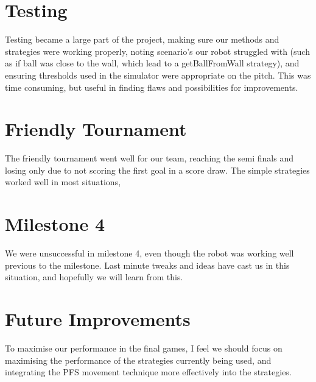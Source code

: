 \documentclass[conference,12pt]{IEEEtran}
\begin{document}

\section{Testing}
Testing became a large part of the project, making sure our methods and strategies were working properly, noting scenario's our robot struggled with (such as if ball was close to the wall, which lead to a getBallFromWall strategy), and ensuring thresholds used in the simulator were appropriate on the pitch. This was time consuming, but useful in finding flaws and possibilities for improvements.

\section{Friendly Tournament}
The friendly tournament went well for our team, reaching the semi finals and losing only due to not scoring the first goal in a score draw. The simple strategies worked well in most situations, 

\section{Milestone 4}
We were unsuccessful in milestone 4, even though the robot was working well previous to the milestone. Last minute tweaks and ideas have cast us in this situation, and hopefully we will learn from this. 

\section{Future Improvements}
To maximise our performance in the final games, I feel we should focus on maximising the performance of the strategies currently being used, and integrating the PFS movement technique more effectively into the strategies. 
\end{document}
